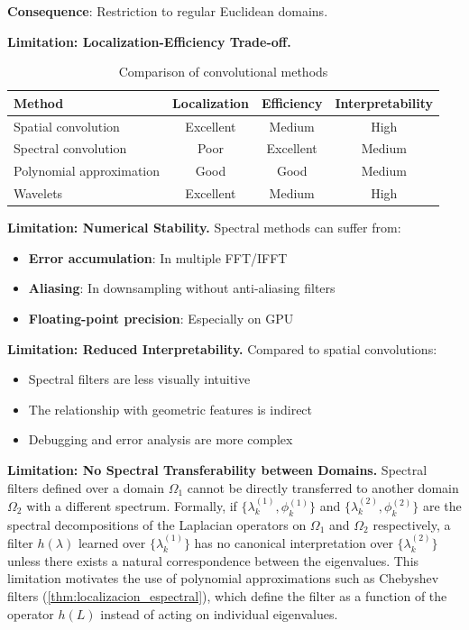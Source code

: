 \textbf{Consequence}: Restriction to regular Euclidean domains.

\textbf{Limitation: Localization-Efficiency Trade-off.}\label{lim:tradeoff_localizacion}
\begin{table}[h]
\centering
\begin{tabular}{|l|c|c|c|}
\hline
\textbf{Method} & \textbf{Localization} & \textbf{Efficiency} & \textbf{Interpretability} \\
\hline
Spatial convolution & Excellent & Medium & High \\
Spectral convolution & Poor & Excellent & Medium \\
Polynomial approximation & Good & Good & Medium \\
Wavelets & Excellent & Medium & High \\
\hline
\end{tabular}
\caption{Comparison of convolutional methods}
\label{tab:comparacion_metodos}
\end{table}

\textbf{Limitation: Numerical Stability.}\label{lim:estabilidad_numerica} Spectral methods can suffer from:
\begin{itemize}
    \item \textbf{Error accumulation}: In multiple \gls{FFT}/IFFT
    \item \textbf{Aliasing}: In downsampling without anti-aliasing filters
    \item \textbf{Floating-point precision}: Especially on GPU
\end{itemize}

\textbf{Limitation: Reduced Interpretability.}\label{lim:interpretabilidad} Compared to spatial convolutions:
\begin{itemize}
    \item Spectral filters are less visually intuitive
    \item The relationship with geometric features is indirect
    \item Debugging and error analysis are more complex
\end{itemize}

\textbf{Limitation: No Spectral Transferability between Domains.}\label{lim:transferibilidad} Spectral filters defined over a domain $\Omega_1$ cannot be directly transferred to another domain $\Omega_2$ with a different spectrum. Formally, if $\{\lambda_k^{(1)}, \phi_k^{(1)}\}$ and $\{\lambda_k^{(2)}, \phi_k^{(2)}\}$ are the spectral decompositions of the Laplacian operators on $\Omega_1$ and $\Omega_2$ respectively, a filter $h(\lambda)$ learned over $\{\lambda_k^{(1)}\}$ has no canonical interpretation over $\{\lambda_k^{(2)}\}$ unless there exists a natural correspondence between the eigenvalues. This limitation motivates the use of polynomial approximations such as Chebyshev filters (\autoref{thm:localizacion_espectral}), which define the filter as a function of the operator $h(L)$ instead of acting on individual eigenvalues.

